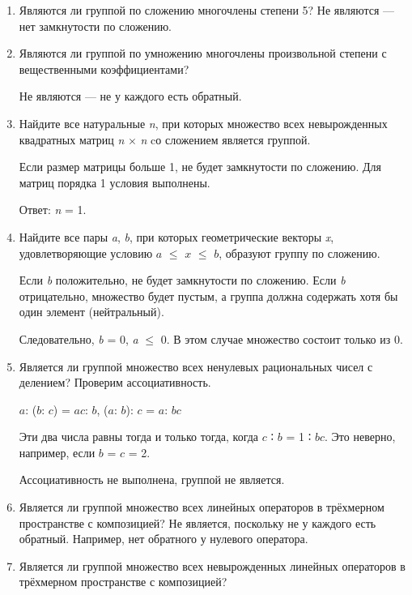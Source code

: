\documentclass[12pt]{article}
\begin{document}
    \begin{enumerate}
        \def\labelenumi{\arabic{enumi}.}
        \item
              Являются ли группой по сложению многочлены степени 5? Не являются ---
              нет замкнутости по сложению.
        \item
              Являются ли группой по умножению многочлены произвольной степени с
              вещественными коэффициентами?

              Не являются --- не у каждого есть обратный.

        \item
              Найдите все натуральные \emph{n}, при которых множество всех
              невырожденных квадратных матриц \emph{n} $\times$ \emph{n} cо сложением
              является группой.

              Если размер матрицы больше 1, не будет замкнутости по сложению. Для
              матриц порядка 1 условия выполнены.

              Ответ: \emph{n} = 1.

        \item
              Найдите все пары \emph{a}, \emph{b}, при которых геометрические
              векторы \emph{x}, удовлетворяющие условию $a$ $\leq$ $x$ $\leq$ $b$, образуют группу
              по сложению.

              Если \emph{b} положительно, не будет замкнутости по сложению. Если
              \emph{b} отрицательно, множество будет пустым, а группа должна содержать
              хотя бы один элемент (нейтральный).

              Следовательно, \emph{b} = 0, \emph{a} $\leq$ 0. В этом случае множество
              состоит только из 0.

        \item
              Является ли группой множество всех ненулевых рациональных чисел с
              делением? Проверим ассоциативность.

              $a$: ($b$: $c$) = $a$$c$: $b$, ($a$: $b$): $c$ = $a$: $b$$c$

                  Эти два числа равны тогда и только тогда, когда $c$ ∶ $b$ = 1 ∶ $b$$c$. Это
                  неверно, например, если $b$ = $c$ = 2.

              Ассоциативность не выполнена, группой не является.

        \item
              Является ли группой множество всех линейных операторов в трёхмерном
              пространстве с композицией? Не является, поскольку не у каждого есть
              обратный. Например, нет обратного у нулевого оператора.
        \item
              Является ли группой множество всех невырожденных линейных операторов в
              трёхмерном пространстве с композицией?


\end{enumerate}
\end{document}
